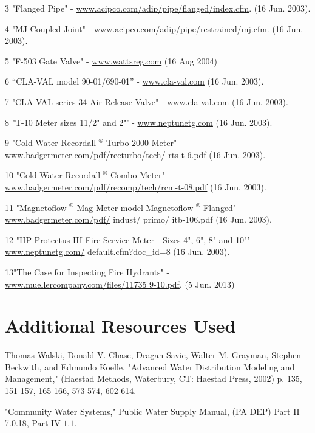 \documentclass[10pt]{article}
\begin{document}
3 "Flanged Pipe" - \href{http://www.acipco.com/adip/pipe/flanged/index.cfm}{www.acipco.com/adip/pipe/flanged/index.cfm}. (16 Jun. 2003).

4 "MJ Coupled Joint" - \href{http://www.acipco.com/adip/pipe/restrained/mj.cfm}{www.acipco.com/adip/pipe/restrained/mj.cfm}. (16 Jun. 2003).

5 "F-503 Gate Valve" - \href{http://www.wattsreg.com}{www.wattsreg.com} (16 Aug 2004)

6 “CLA-VAL model 90-01/690-01” - \href{http://www.cla-val.com}{www.cla-val.com} (16 Jun. 2003).

7 "CLA-VAL series 34 Air Release Valve" - \href{http://www.cla-val.com}{www.cla-val.com} (16 Jun. 2003).

8 "T-10 Meter sizes 11/2" and 2"' - \href{http://www.neptunetg.com}{www.neptunetg.com} (16 Jun. 2003).

9 "Cold Water Recordall ${ }^{\circledR}$ Turbo 2000 Meter" - \href{http://www.badgermeter.com/pdf/recturbo/tech/}{www.badgermeter.com/pdf/recturbo/tech/} rts-t-6.pdf (16 Jun. 2003).

10 "Cold Water Recordall ${ }^{\circledR}$ Combo Meter" - \href{http://www.badgermeter.com/pdf/recomp/tech/rcm-t-08.pdf}{www.badgermeter.com/pdf/recomp/tech/rcm-t-08.pdf} (16 Jun. 2003).

11 "Magnetoflow ${ }^{\circledR}$ Mag Meter model Magnetoflow ${ }^{\circledR}$ Flanged" - \href{http://www.badgermeter.com/pdf/}{www.badgermeter.com/pdf/} indust/ primo/ itb-106.pdf (16 Jun. 2003).

12 "HP Protectus III Fire Service Meter - Sizes 4", 6", 8" and 10"' - \href{http://www.neptunetg.com/}{www.neptunetg.com/} default.cfm?doc\_id=8 (16 Jun. 2003).

13"The Case for Inspecting Fire Hydrants" - \href{http://www.muellercompany.com/files/11735%209-10.pdf}{www.muellercompany.com/files/11735 9-10.pdf}. (5 Jun. 2013)

\section{Additional Resources Used}
Thomas Walski, Donald V. Chase, Dragan Savic, Walter M. Grayman, Stephen Beckwith, and Edmundo Koelle, "Advanced Water Distribution Modeling and Management," (Haestad Methods, Waterbury, CT: Haestad Press, 2002) p. 135, 151-157, 165-166, 573-574, 602-614.

"Community Water Systems," Public Water Supply Manual, (PA DEP) Part II 7.0.18, Part IV $1.1$.
\end{document}
